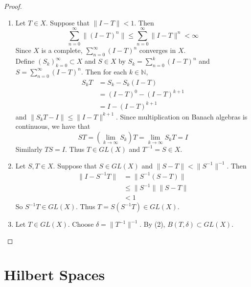\documentclass[12pt]{amsart}
\theoremstyle{definition}
\newcommand{\del}{\delta}
\newcommand{\N}{\mathbb{N}}
\begin{document}
	\begin{proof}\
		\begin{enumerate}
			\item Let $T \in X$. Suppose that $\|I-T \|< 1$. Then $$\sum_{n=0}^{\infty} \|(I -T)^n \| \leq \sum_{n=0}^{\infty} \|I -T \|^{n} < \infty$$ Since $X$ is a complete, $\sum\limits_{n=0}^{\infty}(I-T)^n$ converges in $X$.\\
			Define $(S_k)_{k=0}^{\infty} \subset X$ and $S \in X$ by $S_k = \sum\limits_{n=0}^{k} (I-T)^n$ and \\ $S = \sum\limits_{n=0}^{\infty}(I-T)^n$. Then for each $k \in \N$,
			\begin{align*}
				S_k T
				&= S_k - S_k(I-T) \\
				&= (I-T)^0 - (I-T)^{k+1} \\
				&= I - (I-T)^{k+1}
			\end{align*}
			and $\|S_kT - I \|\leq \|I-T \|^{k+1}$. Since multiplication on Banach algebras is continuous, we have that $$ST = (\lim_{k \rightarrow \infty} S_k)T = \lim\limits_{k \rightarrow \infty}S_kT = I$$
			Similarly $TS = I$. Thus $T \in GL(X)$ and $T^{-1} = S \in X$. \vspace{.5cm}\\
			\item  Let $S, T \in X$. Suppose that $S \in GL(X)$ and $\|S-T \|< \|S^{-1} \|^{-1}$. Then 
			\begin{align*}
				\|I - S^{-1}T \|
				& = \|S^{-1}(S - T) \|\\
				& \leq \|S^{-1} \|\|S -T \|\\
				&< 1
			\end{align*}
			So $S^{-1}T \in GL(X)$. Thus $T = S (S^{-1}T) \in GL(X)$. \vspace{.5cm}\\
			\item Let $T \in GL(X)$. Choose $\del = \|T^{-1}\|^{-1}$. By (2), $B(T, \del) \subset GL(X)$.
		\end{enumerate}
	\end{proof}	
	
	
	
	\newpage
	
	
	
	
	
	
	
	
	
	
	
	
	
	
	
	
	\newpage
	\section{Hilbert Spaces}
	
\end{document}
